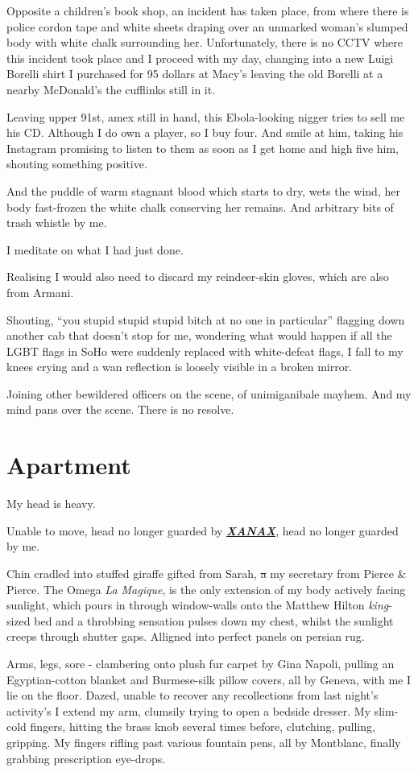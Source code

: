 \documentclass[19pt,openany]{book}
\begin{document}
Opposite a children's
book shop, an incident
has taken place, from
where there is police cordon tape
and white sheets draping over
an unmarked woman's slumped body with
white
chalk surrounding her.
Unfortunately, there is no CCTV
where this incident took place
and I proceed with my day,
changing into a new Luigi Borelli
shirt I purchased for 95 dollars
at Macy's
leaving the old Borelli
at a nearby McDonald's
the cufflinks still in it.

Leaving upper 91st, amex still in hand,
this Ebola-looking nigger tries to sell
me his CD. Although I do own a player,
so I buy
four. And smile at him, taking his Instagram
promising to listen to them as soon as I get
home and high five him, shouting something positive.

And the puddle of warm stagnant blood
which starts
to dry, wets the wind,
her body fast-frozen
the white chalk conserving her remains.
And arbitrary bits of trash
whistle by me.

I meditate on what I had just done.

Realising
I would also need to discard my reindeer-skin
gloves, which are also from Armani.

Shouting, ``you stupid stupid stupid
bitch at no one in particular'' flagging
down another cab that doesn't stop for me, wondering
what would happen if all the LGBT flags in SoHo
were suddenly replaced with white-defeat flags, I fall
to my knees crying and a wan reflection is loosely
visible in a broken mirror.

Joining other bewildered officers on the scene,
of unimiganibale mayhem. And my mind pans over the scene.
There is no resolve.
\chapter{Apartment}
My head is heavy.

Unable to move, head no longer guarded by \underline{\textbf{\textit{XANAX}}},
head no longer guarded by me.

Chin cradled into stuffed giraffe gifted from Sarah, \sout{a} my
secretary from Pierce \& Pierce. The Omega \textit{La Magique}, is the only extension
of my body actively facing sunlight, which pours in through window-walls
onto the Matthew Hilton \textit{king}-sized bed and a throbbing
sensation pulses down my chest, whilst the sunlight creeps through
shutter gaps. Alligned into perfect panels on persian rug.

Arms, legs, sore - clambering onto plush
fur carpet by Gina Napoli, pulling an
Egyptian-cotton blanket
and Burmese-silk pillow covers,
all by Geneva, with me I lie
on the floor.
Dazed, unable to recover any
recollections from last night's
activity's I extend my arm,
clumsily trying to open
a bedside dresser. My slim-cold fingers,
hitting the brass knob several
times before, clutching, pulling,
gripping. My fingers rifling
past various fountain pens,
all by Montblanc, finally grabbing
prescription eye-drops.
\end{document}
